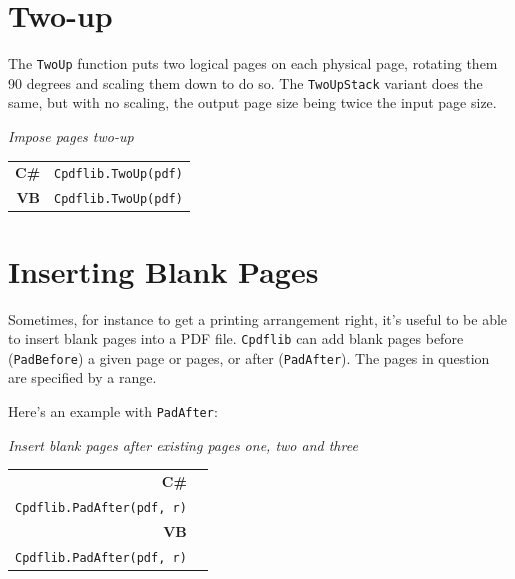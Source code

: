 \documentclass[a4paper]{memoir}
\begin{document}
\section{Two-up}
The \verb!TwoUp! function puts two logical pages on each physical page,
rotating them 90 degrees and scaling them down to do so. The \verb!TwoUpStack! variant does the same, but with no scaling, the output page size being twice the input page size.
\begin{framed}
\noindent\textit{Impose pages two-up}

\vspace{2mm}
\noindent\begin{tabular}{rl}
\small\sffamily\textbf{C\#} &
\begin{minipage}{4in}
\small\verb!Cpdflib.TwoUp(pdf)!
\end{minipage}\\[5mm]
\small\sffamily\textbf{VB} &
\begin{minipage}{4in}
\small\verb!Cpdflib.TwoUp(pdf)!
\end{minipage}\\[5mm]
\end{tabular}
\end{framed}

\section{Inserting Blank Pages}

Sometimes, for instance to get a printing arrangement right, it's useful to be
able to insert blank pages into a PDF file. \verb!Cpdflib! can add blank pages
before (\verb!PadBefore!) a given page or pages, or after (\verb!PadAfter!).
The pages in question are specified by a range.

Here's an example with \verb!PadAfter!:
\begin{framed}
\noindent\textit{Insert blank pages after existing pages one, two and three}

\vspace{2mm}
\noindent\begin{tabular}{rl}
\small\sffamily\textbf{C\#} &
\begin{minipage}{4in}
\small\verb!int[] r = {1, 2, 3}!\\
\verb!Cpdflib.PadAfter(pdf, r)!
\end{minipage}\\[5mm]
\small\sffamily\textbf{VB} &
\begin{minipage}{4in}
\small\verb!Dim r As Integer() r = {1, 2, 3}!\\
\verb!Cpdflib.PadAfter(pdf, r)!
\end{minipage}\\[5mm]
\end{tabular}
\end{framed}
\end{document}
